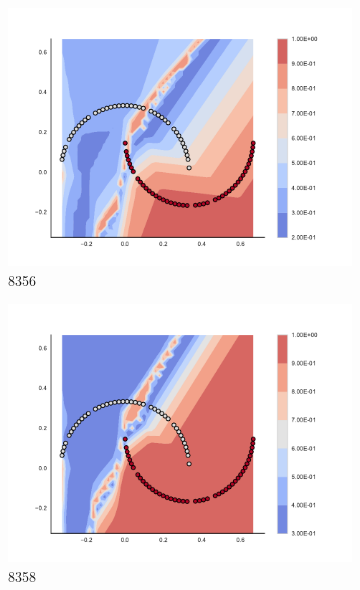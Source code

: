 \begin{figure}[h]
\begin{subfigure}[b]{0.09\textwidth}
    \includegraphics[clip, trim=2.35cm 1.75cm 4.5cm 0cm,width=\textwidth]{img/convergence/8356.pdf}
    \caption{8356}
    \label{fig:convergence_8356}
\end{subfigure}
%
\begin{subfigure}[b]{0.09\textwidth}
    \includegraphics[clip, trim=2.35cm 1.75cm 4.5cm 0cm,width=\textwidth]{img/convergence/8358.pdf}
    \caption{8358}
    \label{fig:convergence_8358}
\end{subfigure}
%
\begin{subfigure}[b]{0.09\textwidth}

\end{subfigure}
\end{figure}
